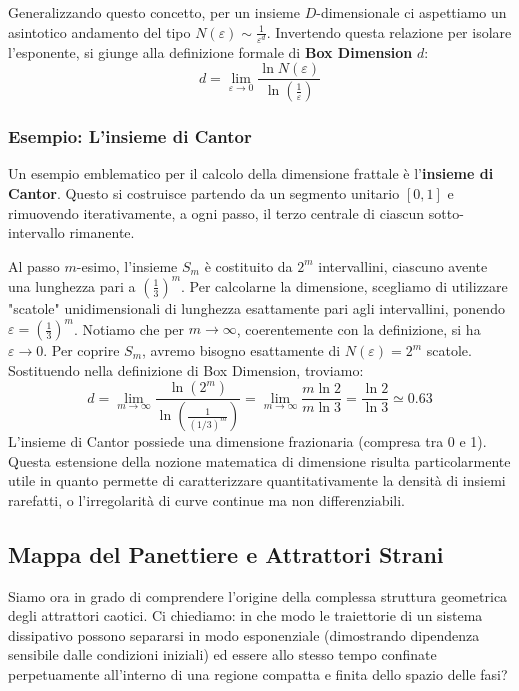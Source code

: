 \documentclass[openany]{book}
\theoremstyle{definition}
\theoremstyle{remark}
\begin{document}
Generalizzando questo concetto, per un insieme $D$-dimensionale ci aspettiamo un asintotico andamento del tipo $N(\varepsilon) \sim \frac{1}{\varepsilon^d}$. Invertendo questa relazione per isolare l'esponente, si giunge alla definizione formale di \textbf{Box Dimension} $d$:
\begin{equation}
    d = \lim_{\varepsilon \to 0} \frac{\ln N(\varepsilon)}{\ln \left(\frac{1}{\varepsilon}\right)}
\end{equation}

\subsubsection*{Esempio: L'insieme di Cantor}
Un esempio emblematico per il calcolo della dimensione frattale è l'\textbf{insieme di Cantor}. Questo si costruisce partendo da un segmento unitario $[0,1]$ e rimuovendo iterativamente, a ogni passo, il terzo centrale di ciascun sotto-intervallo rimanente.

Al passo $m$-esimo, l'insieme $S_m$ è costituito da $2^m$ intervallini, ciascuno avente una lunghezza pari a $\left(\frac{1}{3}\right)^m$. 
Per calcolarne la dimensione, scegliamo di utilizzare "scatole" unidimensionali di lunghezza esattamente pari agli intervallini, ponendo $\varepsilon = \left(\frac{1}{3}\right)^m$. Notiamo che per $m \to \infty$, coerentemente con la definizione, si ha $\varepsilon \to 0$. Per coprire $S_m$, avremo bisogno esattamente di $N(\varepsilon) = 2^m$ scatole. Sostituendo nella definizione di Box Dimension, troviamo:
\begin{equation}
    d = \lim_{m \to \infty} \frac{\ln(2^m)}{\ln\left( \frac{1}{(1/3)^m} \right)} = \lim_{m \to \infty} \frac{m \ln 2}{m \ln 3} = \frac{\ln 2}{\ln 3} \simeq 0.63
\end{equation}
L'insieme di Cantor possiede una dimensione frazionaria (compresa tra 0 e 1). Questa estensione della nozione matematica di dimensione risulta particolarmente utile in quanto permette di caratterizzare quantitativamente la densità di insiemi rarefatti, o l'irregolarità di curve continue ma non differenziabili.


\subsection*{Mappa del Panettiere e Attrattori Strani}

Siamo ora in grado di comprendere l'origine della complessa struttura geometrica degli attrattori caotici. Ci chiediamo: in che modo le traiettorie di un sistema dissipativo possono separarsi in modo esponenziale (dimostrando dipendenza sensibile dalle condizioni iniziali) ed essere allo stesso tempo confinate perpetuamente all'interno di una regione compatta e finita dello spazio delle fasi?
\end{document}

